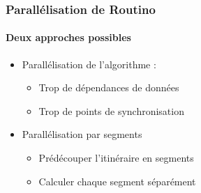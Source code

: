 
\begin{frame}
  \frametitle{Parallélisation de Routino}
  \framesubtitle{Deux approches possibles}
  \begin{itemize}
  \item Parallélisation de l'algorithme :
    \begin{itemize}
    \item Trop de dépendances de données
    \item Trop de points de synchronisation
    \end{itemize}
    \vspace{1em}
  \item Parallélisation par segments
    \begin{itemize}
    \item Prédécouper l'itinéraire en segments
    \item Calculer chaque segment séparément
    \end{itemize}
  \end{itemize}
\end{frame}


